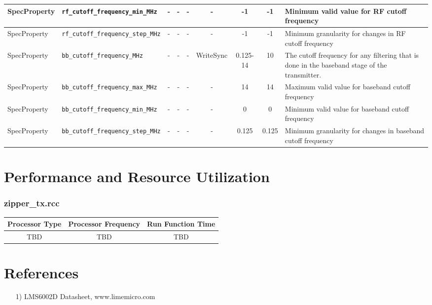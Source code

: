 \documentclass{article}
\def\comp{zipper\_tx}
\begin{document}
\begin{landscape}
\begin{scriptsize}
\begin{tabular}{|p{2cm}|p{4cm}|c|c|c|c|c|c|p{6.5cm}|}
			\hline
			SpecProperty & \verb+rf_cutoff_frequency_min_MHz+  & -    & -        & -          & -              & -1           & -1      & Minimum valid value for RF cutoff frequency                                                   \\
			\hline
			SpecProperty & \verb+rf_cutoff_frequency_step_MHz+ & -    & -        & -          & -              & -1           & -1      & Minimum granularity for changes in RF cutoff frequency                                        \\
			\hline
			SpecProperty & \verb+bb_cutoff_frequency_MHz+      & -    & -        & -          & WriteSync      & 0.125-14     & 10      & The cutoff frequency for any filtering that is done in the baseband stage of the transmitter. \\
			\hline
			SpecProperty & \verb+bb_cutoff_frequency_max_MHz+  & -    & -        & -          & -              & 14           & 14      & Maximum valid value for baseband cutoff frequency                                             \\
			\hline
			SpecProperty & \verb+bb_cutoff_frequency_min_MHz+  & -    & -        & -          & -              & 0            & 0       & Minimum valid value for baseband cutoff frequency                                             \\
			\hline
			SpecProperty & \verb+bb_cutoff_frequency_step_MHz+ & -    & -        & -          & -              & 0.125        & 0.125   & Minimum granularity for changes in baseband cutoff frequency                                  \\
			\hline
		\end{tabular}
	\end{scriptsize}
\end{landscape}

\section*{Performance and Resource Utilization}
\subsubsection*{\comp.rcc}
\begin{scriptsize}
	\begin{tabular}{|c|c|c|}
		\hline
		\rowcolor{blue}
		Processor Type & Processor Frequency & Run Function Time \\
		\hline
		TBD            & TBD                 & TBD               \\
		\hline
	\end{tabular}
\end{scriptsize}


\section*{References}
\begin{itemize}
	\item[1)] LMS6002D Datasheet, www.limemicro.com
\end{itemize}
\end{document}
